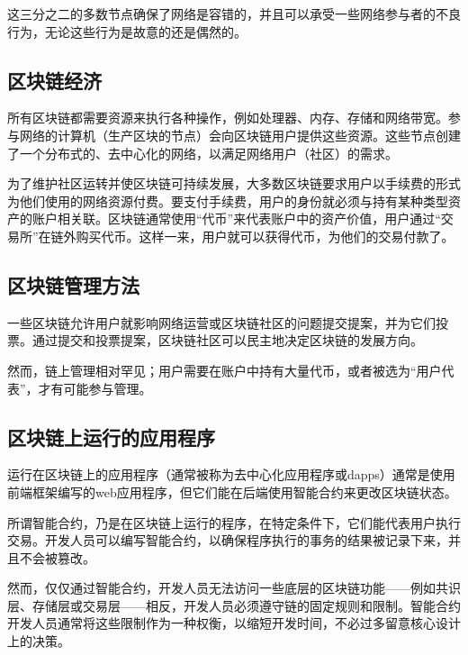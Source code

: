 这三分之二的多数节点确保了网络是容错的，并且可以承受一些网络参与者的不良行为，无论这些行为是故意的还是偶然的。

\hypertarget{ux533aux5757ux94feux7ecfux6d4e}{%
\subsection{区块链经济}\label{ux533aux5757ux94feux7ecfux6d4e}}

所有区块链都需要资源来执行各种操作，例如处理器、内存、存储和网络带宽。参与网络的计算机（生产区块的节点）会向区块链用户提供这些资源。这些节点创建了一个分布式的、去中心化的网络，以满足网络用户（社区）的需求。

为了维护社区运转并使区块链可持续发展，大多数区块链要求用户以手续费的形式为他们使用的网络资源付费。要支付手续费，用户的身份就必须与持有某种类型资产的账户相关联。区块链通常使用``代币''来代表账户中的资产价值，用户通过``交易所''在链外购买代币。这样一来，用户就可以获得代币，为他们的交易付款了。

\hypertarget{ux533aux5757ux94feux7ba1ux7406ux65b9ux6cd5}{%
\subsection{区块链管理方法}\label{ux533aux5757ux94feux7ba1ux7406ux65b9ux6cd5}}

一些区块链允许用户就影响网络运营或区块链社区的问题提交提案，并为它们投票。通过提交和投票提案，区块链社区可以民主地决定区块链的发展方向。

然而，链上管理相对罕见；用户需要在账户中持有大量代币，或者被选为``用户代表''，才有可能参与管理。

\hypertarget{ux533aux5757ux94feux4e0aux8fd0ux884cux7684ux5e94ux7528ux7a0bux5e8f}{%
\subsection{区块链上运行的应用程序}\label{ux533aux5757ux94feux4e0aux8fd0ux884cux7684ux5e94ux7528ux7a0bux5e8f}}

运行在区块链上的应用程序（通常被称为去中心化应用程序或dapps）通常是使用前端框架编写的web应用程序，但它们能在后端使用智能合约来更改区块链状态。

所谓智能合约，乃是在区块链上运行的程序，在特定条件下，它们能代表用户执行交易。开发人员可以编写智能合约，以确保程序执行的事务的结果被记录下来，并且不会被篡改。

然而，仅仅通过智能合约，开发人员无法访问一些底层的区块链功能------例如共识层、存储层或交易层------相反，开发人员必须遵守链的固定规则和限制。智能合约开发人员通常将这些限制作为一种权衡，以缩短开发时间，不必过多留意核心设计上的决策。

